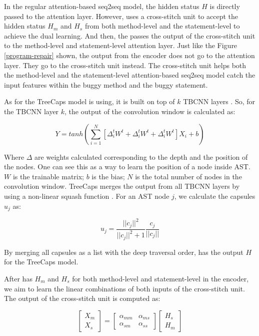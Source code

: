 In the regular attention-based seq2seq model, the hidden status $H$ is directly passed to the attention layer. However, \tool uses a cross-stitch unit to accept the hidden status $H_m$ and $H_s$ from both method-level and the statement-level to achieve the dual learning. And then, the \tool passes the output of the cross-stitch unit to the method-level and statement-level attention layer. Just like the Figure \ref{program-repair} shown, the output from the encoder does not go to the attention layer. They go to the cross-stitch unit instead. The cross-stitch unit helps both the method-level and the statement-level attention-based seq2seq model catch the input features within the buggy method and the buggy statement.

As for the TreeCaps model \tool is using, it is built on top of $k$ TBCNN layers \cite{mou2014tbcnn}. So, for the TBCNN layer $k$, the output of the convolution window is calculated as:

\begin{equation}\label{eq:1}
	Y = tanh(\sum_{i=1}^{N}[\Delta^t_iW^t + \Delta^t_iW^t + \Delta^t_iW^t]X_i + b)
\end{equation}

Where $\Delta$ are weights calculated corresponding to the depth and the position of the nodes. One can see this as a
way to learn the position of a node inside AST. $W$ is the trainable matrix; $b$ is the bias; $N$ is the total number of nodes in the convolution window. TreeCaps merges the output from all TBCNN layers by using a non-linear squash
function \cite{sabour2017dynamic}. For an AST node $j$, we calculate the capsules $u_j$ as:

\begin{equation}\label{eq:2}
	u_j = \frac{||c_j||^2}{||c_j||^2+1}\frac{c_j}{||c_j||}
\end{equation}

By merging all capsules as a list with the deep traversal order, \tool has the output $H$ for the TreeCaps model.

After \tool has $H_m$ and $H_s$ for both method-level and statement-level in the encoder, we aim to learn the linear combinations of both inputs of the cross-stitch unit. The output of the cross-stitch unit is computed as:

\begin{equation}\label{eq:3}
	\begin{bmatrix}
		X_m\\
		X_s
	\end{bmatrix}
	=
	\begin{bmatrix}
		\alpha_{mm} &  \alpha_{ms} \\
		\alpha_{sm} &  \alpha_{ss}
	\end{bmatrix}
	\begin{bmatrix}
		H_s\\
		H_m
	\end{bmatrix}
\end{equation}

